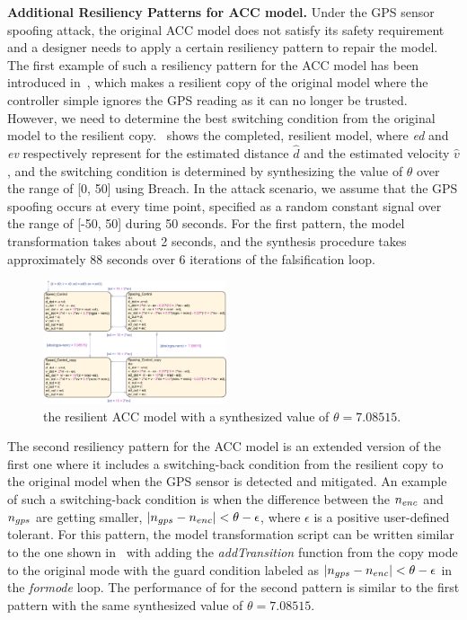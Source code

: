 \vspace{0.5em}
\noindent
{\bf Additional Resiliency Patterns for ACC model.} Under the GPS sensor spoofing  attack, the original ACC model does not satisfy its safety requirement and a designer needs to apply a certain resiliency pattern to repair the model. The first example of such a resiliency pattern for the ACC model has been introduced in~, which makes a resilient copy of the original model where the controller simple ignores the GPS reading as it can no longer be trusted. However, we need to determine the best switching condition from the original model to the resilient copy.~ shows the completed, resilient model, where \emph{ed} and \emph{ev} respectively represent for the estimated distance $\hat{d}$ and the estimated velocity $\hat{v}$, and the switching condition is determined by synthesizing the value of $\theta$ over the range of [0, 50] using Breach. In the attack scenario, we assume that the GPS spoofing occurs at every time point, specified as a random constant signal over the range of [-50, 50] during 50 seconds. For the first pattern, the model transformation takes about 2 seconds, and the synthesis procedure takes approximately 88 seconds over 6 iterations of the falsification loop.   

\begin{figure}[t!]%
	\centering%
    \includegraphics[width=0.48\textwidth]{image/acc_model_pat1}%
	\caption{the resilient ACC model with a synthesized value of $\theta = 7.08515$.}%
\end{figure}%

The second resiliency pattern for the ACC model is an extended version of the first one where it includes a switching-back condition from the resilient copy to the original model when the GPS sensor is detected and mitigated. An example of such a switching-back condition is when the difference between the $n_{enc}$ and $n_{gps}$ are getting smaller, \ie $|n_{gps} -n_{enc}| < \theta - \epsilon$, where $\epsilon$ is a positive user-defined tolerant. For this pattern, the model transformation script can be written similar to the one shown in~ with adding the \emph{addTransition} function from the copy mode to the original mode with the guard condition labeled as $|n_{gps} -n_{enc}| < \theta - \epsilon$ in the \emph{formode} loop.
%
The performance of \toolreaffirm for the second pattern is similar to the first pattern with the same synthesized value of $\theta = 7.08515$.



